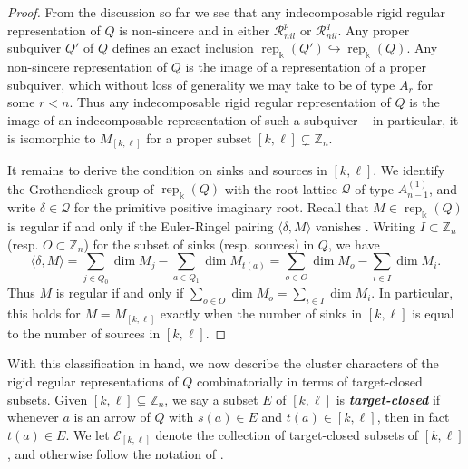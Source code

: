 \documentclass[12pt]{amsart}
\newcommand{\sayHW}[1]{\say[HW]{\color{violet}{\bf HW:}\;#1}}
\newcommand{\sayDR}[1]{\say[DR]{\color{red}{\bf DR:}\;#1}}
\newcommand{\newword}[1]{\textbf{\emph{#1}}}
\newcommand{\ZZ}{\mathbb{Z}}
\newcommand{\kk}{\Bbbk}
\newcommand{\bfg}{\mathbf{g}}
\newcommand{\cE}{\mathcal{E}}
\newcommand{\cQ}{\mathcal{Q}}
\newcommand{\cR}{\mathcal{R}}
\newcommand{\rep}{\operatorname{rep}}
\newcommand\into{\hookrightarrow}
\newcommand{\Qrep}{M}
\theoremstyle{remark}
\numberwithin{equation}{section}
\numberwithin{figure}{section}
\begin{document}
\begin{proof}
  From the discussion so far we see that any indecomposable rigid regular representation of $Q$ is non-sincere and in either $\cR_{nil}^p$ or $\cR_{nil}^q$.
  Any proper subquiver $Q'$ of $Q$ defines an exact inclusion $\rep_\kk(Q') \into \rep_\kk(Q)$.
  Any non-sincere representation of $Q$ is the image of a representation of a proper subquiver, which without loss of generality we may take to be of type $A_r$ for some $r < n$.
  Thus any indecomposable rigid regular representation of $Q$ is the image of an indecomposable representation of such a subquiver -- in particular, it is isomorphic to $\Qrep_{[k,\ell]}$ for a proper subset $[k,\ell]\subsetneq\ZZ_n$.

  It remains to derive the condition on sinks and sources in $[k,\ell]$.
  We identify the Grothendieck group of $\rep_\kk(Q)$ with the root lattice $\cQ$ of type $A_{n-1}^{\!(1)}$, and write $\delta\in\cQ$ for the primitive positive imaginary root.
  Recall that $\Qrep \in \rep_\kk(Q)$ is regular if and only if the Euler-Ringel pairing $\langle\delta,\Qrep\rangle$ vanishes \cite[Section 7]{CrBo92}.
  Writing $I \subset \ZZ_n$ (resp. $O \subset \ZZ_n$) for the subset of sinks (resp. sources) in $Q$, we have  
  \[
    \langle\delta,\Qrep\rangle
    =
    \sum_{j\in Q_0}\dim \Qrep_j-\sum_{a\in Q_1}\dim \Qrep_{t(a)}
    =
    \sum_{o\in O}\dim \Qrep_o-\sum_{i\in I}\dim \Qrep_i.
  \]
  Thus $\Qrep$ is regular if and only if $\sum\limits_{o\in O}\dim \Qrep_o=\sum\limits_{i\in I}\dim \Qrep_i$.
  In particular, this holds for $\Qrep = \Qrep_{[k,\ell]}$ exactly when the number of sinks in $[k,\ell]$ is equal to the number of sources in $[k,\ell]$.
\end{proof}

With this classification in hand, we now describe the cluster characters of the rigid regular representations of $Q$ combinatorially in terms of target-closed subsets.
Given $[k,\ell]\subsetneq\ZZ_n$, we say a subset $E$ of $[k,\ell]$ is \newword{target-closed} if whenever $a$ is an arrow of $Q$ with $s(a) \in E$ and $t(a) \in [k,\ell]$, then in fact $t(a) \in E$.
We let $\cE_{[k,\ell]}$ denote the collection of target-closed subsets of $[k,\ell]$, and otherwise follow the notation of .
\end{document}
